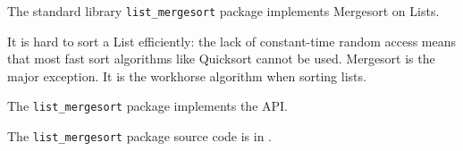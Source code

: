 
The standard library {\tt list\_mergesort} package implements Mergesort on Lists.

It is hard to sort a List efficiently:  the lack of constant-time random access 
means that most fast sort algorithms like Quicksort cannot be used.  Mergesort 
is the major exception.  It is the workhorse algorithm when sorting lists.

The {\tt list\_mergesort} package implements the  API.

The {\tt list\_mergesort} package source code is in .




